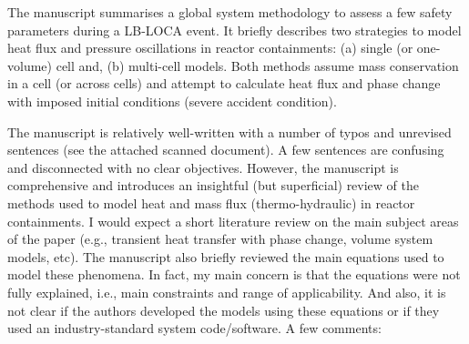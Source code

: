 \documentclass[14pt,twoside]{report}
\begin{document}
\medskip

The manuscript summarises a global system methodology to assess a few safety parameters during a LB-LOCA event. It briefly describes two strategies to model heat flux and pressure oscillations in reactor containments: (a) single (or one-volume) cell and, (b) multi-cell models. Both methods assume mass conservation in a cell (or across cells) and attempt to calculate heat flux and phase change with imposed initial conditions (severe accident condition).

The manuscript is relatively well-written with a number of typos and unrevised sentences (see the attached scanned document). A few sentences are confusing and disconnected with no clear objectives. However, the manuscript is comprehensive and introduces an insightful (but superficial) review of the methods used to model heat and mass flux (thermo-hydraulic) in reactor containments.  I would expect a short literature review on the main subject areas of the paper (e.g., transient heat transfer with phase change, volume system models, etc). The manuscript also briefly reviewed the main equations used to model these phenomena. In fact, my main concern is that the equations were not fully explained, i.e., main constraints and range of applicability. And also, it is not clear if the authors developed the models using these equations or if they used an industry-standard system code/software. A few comments:
\end{document}
